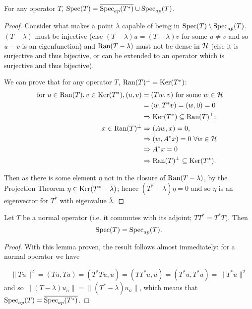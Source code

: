 \documentclass[../main.tex]{subfiles}
\begin{document}
\begin{lemma}
For any operator $T$, $\mathrm{Spec}(T) = \overline{\mathrm{Spec}_{ap} (T^*)} \cup \mathrm{Spec}_{ap} (T)$.
\end{lemma}
\begin{proof}
Consider what makes a point $\lambda$ capable of being in $\mathrm{Spec}(T) \setminus \mathrm{Spec}_{ap}(T)$. $(T - \lambda)$ must be injective (else $(T - \lambda)u = (T - \lambda)v$ for some $u \neq v$ and so $u-v$ is an eigenfunction) and $\mathrm{Ran}(T - \lambda)$ must not be dense in $\mathcal{H}$ (else it is surjective and thus bijective, or can be extended to an operator which is surjective and thus bijective).

We can prove that for any operator $T$, $\mathrm{Ran}(T)^\perp = \mathrm{Ker}(T^*)$:
\begin{align*}
\text{ for } u \in \mathrm{Ran}(T), v \in \mathrm{Ker}(T^*), (u, v) & = (Tw, v) \text{ for some $w \in \mathcal{H}$} \\
& = (w, T^*v) = (w, 0) = 0 \\
& \Rightarrow \mathrm{Ker}(T^*) \subseteq \mathrm{Ran}(T)^\perp ;\\
x \in \mathrm{Ran}(T)^\perp & \Rightarrow (Aw, x) = 0, \\
& \Rightarrow (w, A^*x) = 0\ \forall w \in \mathcal{H} \\
&  \Rightarrow A^*x = 0 \\
& \Rightarrow \mathrm{Ran}(T)^\perp \subseteq \mathrm{Ker}(T^*).
\end{align*}

Then as there is some element $\eta$ not in the closure of  $\mathrm{Ran}(T - \lambda)$, by the Projection Theorem $\eta \in \mathrm{Ker}(T^* - \overline{\lambda})$; hence $(T^* - \overline{\lambda})\eta = 0$ and so $\eta$ is an eigenvector for $T^*$ with eigenvalue $\overline{\lambda}.$
\end{proof}

\begin{theorem}\label{thm:normal-spec} \cite{halmos1982hilbert}
Let $T$ be a normal operator (i.e. it commutes with its adjoint; $TT^* = T^*T$). Then $$\mathrm{Spec}(T) = \mathrm{Spec}_{ap}(T).$$
\end{theorem}
\begin{proof}
With this lemma proven, the result follows almost immediately: for a normal operator we have

$$\|Tu\|^2 = (Tu, Tu) = (T^*Tu, u) = (TT^*u, u) = (T^*u, T^*u) = \|T^*u\|^2$$
and so $\|(T - \lambda)u_n\| = \|(T^* - \overline{\lambda})u_n\|$,
which means that $\mathrm{Spec}_{ap}(T) = \overline{\mathrm{Spec}_{ap} (T^*)}$. 
\end{proof}
\end{document}

